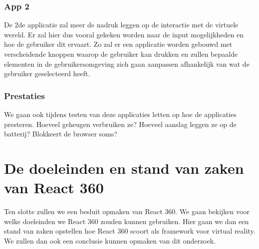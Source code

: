 \subsubsection{App 2}
De 2de applicatie zal meer de nadruk leggen op de interactie met de virtuele wereld. Er zal hier dus vooral gekeken worden naar de input mogelijkheden en hoe de gebruiker dit ervaart. Zo zal er een applicatie worden gebouwd met verscheidende knoppen waarop de gebruiker kan drukken en zullen bepaalde elementen in de gebruikersomgeving zich gaan aanpassen afhankelijk van wat de gebruiker geselecteerd heeft.

\subsubsection{Prestaties}
We gaan ook tijdens testen van deze applicaties letten op hoe de applicaties presteren. Hoeveel geheugen verbruiken ze? Hoeveel aanslag leggen ze op de batterij? Blokkeert de browser soms?

\section{De doeleinden en stand van zaken van React 360}
\label{sec:doeleinden-reactvr}
Ten slotte zullen we een besluit opmaken van React 360. We gaan bekijken voor welke doeleinden we React 360 zouden kunnen gebruiken. Hier gaan we dan een stand van zaken opstellen hoe React 360 scoort als framework voor virtual reality. We zullen dan ook een conclusie kunnen opmaken van dit onderzoek.



